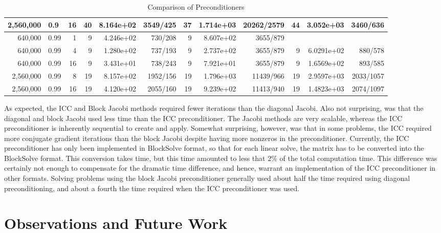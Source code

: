 \begin{table}[htbp]
\begin{center}
\begin{tiny}
\begin{tabular}{|rlr|rrr|rrr|rrr|}
2,560,000 & 0.9 & 16 & 40 & 8.164e+02 & 3549/425 & 37 & 1.714e+03 & 20262/2579 & 44 & 3.052e+03 & 3460/636 \\
\hline
640,000 & 0.99 & 1 &  9 & 4.246e+02 &  730/208 &  9 & 8.607e+02 & 3655/879 &  & & \\
640,000 & 0.99 & 4 &  9 & 1.280e+02 &  737/193 &  9 & 2.737e+02 & 3655/879 &  9 & 6.0291e+02 &  880/578 \\
640,000 & 0.99 & 16 &  9 & 3.431e+01 &  738/243 &  9 & 7.921e+01 & 3655/879 &  9 & 1.6569e+02 &  893/585  \\
2,560,000 & 0.99 & 8  & 19 & 8.157e+02 & 1952/156 & 19 & 1.796e+03 & 11439/966 & 19 & 2.9597e+03 & 2033/1057  \\
2,560,000 & 0.99 & 16 & 19 & 4.120e+02 & 2055/160 & 19 & 9.239e+02 & 11413/940 & 19 & 1.4823e+03 & 2074/1097 \\
\hline
\end{tabular}
\label{preconditioners}
\caption{Comparison of Preconditioners}
\end{tiny}\end{center}
\end{table}

As expected, the ICC and Block Jacobi methods required fewer
iterations than the diagonal Jacobi.  Also not surprising, was
that the diagonal and block Jacobi used less time than
the ICC preconditioner.
The Jacobi methods are very scalable, whereas
the ICC preconditioner is inherently sequential to create
and apply.  Somewhat surprising, however, was that in some problems, the ICC
required more conjugate gradient iterations than the
block Jacobi despite having more nonzeros in the preconditioner.
Currently, the ICC preconditioner has only been implemented in
BlockSolve format, so that for each linear solve, the matrix has to
be converted into the BlockSolve format.  This conversion takes
time, but this time amounted to less that $2\%$ of the total computation time.
This difference was certainly not enough to compensate for
the dramatic time difference, and hence, warrant an implementation
of the ICC preconditioner in other formats.
Solving problems using the block Jacobi preconditioner generally used
about half the time required using diagonal preconditioning, and
about a fourth the time required when the ICC preconditioner was used.

\section{Observations and Future Work}

